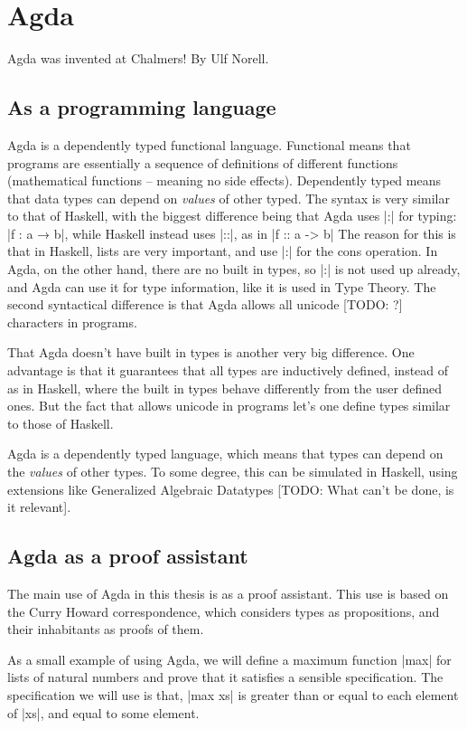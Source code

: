 \section{Agda}
Agda was invented at Chalmers! By Ulf Norell.
\subsection{As a programming language}
Agda is a dependently typed functional language. Functional means that programs are essentially a sequence of definitions of different functions (mathematical functions -- meaning no side effects). Dependently typed means that data types can depend on \emph{values} of other typed. The syntax is very similar to that of Haskell, with the biggest difference being that Agda uses |:| for typing: |f : a → b|, while Haskell instead uses |::|, as in |f :: a -> b|
The reason for this is that in Haskell, lists are very important, and use |:| for the cons operation. In Agda, on the other hand, there are no built in types, so |:| is not used up already, and Agda can use it for type information, like it is used in Type Theory. The second syntactical difference is that Agda allows all unicode [TODO: ?] characters in programs.

That Agda doesn't have built in types is another very big difference. One advantage is that it guarantees that all types are inductively defined, instead of as in Haskell, where the built in types behave differently from the user defined ones. But the fact that allows unicode in programs let's one define types similar to those of Haskell.



Agda is a dependently typed language, which means that types can depend on the \emph{values} of other types. To some degree, this can be simulated in Haskell, using extensions like Generalized Algebraic Datatypes [TODO: What can't be done, is it relevant].

\subsection{Agda as a proof assistant}
The main use of Agda in this thesis is as a proof assistant. This use is based on the Curry Howard correspondence, which considers types as propositions, and their inhabitants as proofs of them.

As a small example of using Agda, we will define a maximum function |max| for lists of natural numbers and prove that it satisfies a sensible specification. The specification we will use is that, |max xs| is greater than or equal to each element of |xs|, and equal to some element. 


